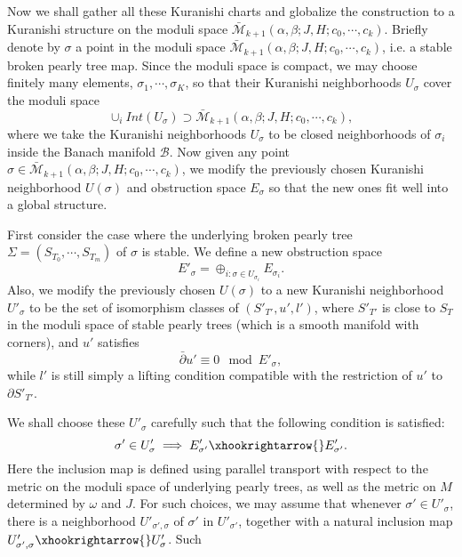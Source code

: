 \documentclass{amsart}
\numberwithin{equation}{section}
\numberwithin{figure}{section}
\begin{document}
	Now we shall gather all these Kuranishi charts and globalize the construction to a Kuranishi structure on the moduli space $\bar{\mathcal{M}}_{k+1}(\alpha, \beta; J, H; c_{0}, \cdots, c_{k})$. Briefly denote by $\sigma$ a point in the moduli space $\bar{\mathcal{M}}_{k+1}(\alpha, \beta; J, H; c_{0}, \cdots, c_{k})$, i.e. a stable broken pearly tree map. Since the moduli space is compact, we may choose finitely many elements, $\sigma_{1}, \cdots, \sigma_{K}$, so that their Kuranishi neighborhoods $U_{\sigma}$ cover the moduli space
\begin{equation}
\cup_{i} Int(U_{\sigma}) \supset \bar{\mathcal{M}}_{k+1}(\alpha, \beta; J, H; c_{0}, \cdots, c_{k}),
\end{equation}
where we take the Kuranishi neighborhoods $U_{\sigma}$ to be closed neighborhoods of $\sigma_{i}$ inside the Banach manifold $\mathcal{B}$. Now given any point $\sigma \in \bar{\mathcal{M}}_{k+1}(\alpha, \beta; J, H; c_{0}, \cdots, c_{k})$, we modify the previously chosen Kuranishi neighborhood $U(\sigma)$ and obstruction space $E_{\sigma}$ so that the new ones fit well into a global structure. \par
	First consider the case where the underlying broken pearly tree $\Sigma = (S_{T_{0}}, \cdots, S_{T_{m}})$ of $\sigma$ is stable. We define a new obstruction space
\begin{equation}\label{new obstruction space from a finite covering}
E'_{\sigma} = \oplus_{i: \sigma \in U_{\sigma_{i}}} E_{\sigma_{i}}.
\end{equation}
Also, we modify the previously chosen $U(\sigma)$ to a new Kuranishi neighborhood $U'_{\sigma}$ to be the set of isomorphism classes of $(S'_{T'}, u', l')$, where $S'_{T'}$ is close to $S_{T}$ in the moduli space of stable pearly trees (which is a smooth manifold with corners), and $u'$ satisfies
\begin{equation}\label{Cauchy-Riemann equation with the new obstruction space}
\bar{\partial}u' \equiv 0 \mod E'_{\sigma},
\end{equation}
while $l'$ is still simply a lifting condition compatible with the restriction of $u'$ to $\partial S'_{T'}$. \par
	We shall choose these $U'_{\sigma}$ carefully such that the following condition is satisfied:
\begin{equation}
\sigma' \in U'_{\sigma} \implies E'_{\sigma'} \xhookrightarrow{} E'_{\sigma'}.
\end{equation}
Here the inclusion map is defined using parallel transport with respect to the metric on the moduli space of underlying pearly trees, as well as the metric on $M$ determined by $\omega$ and $J$. For such choices, we may assume that whenever $\sigma' \in U'_{\sigma}$, there is a neighborhood $U'_{\sigma', \sigma}$ of $\sigma'$ in $U'_{\sigma'}$, together with a natural inclusion map $U'_{\sigma', \sigma} \xhookrightarrow{} U'_{\sigma}$. Such 
\end{document}
